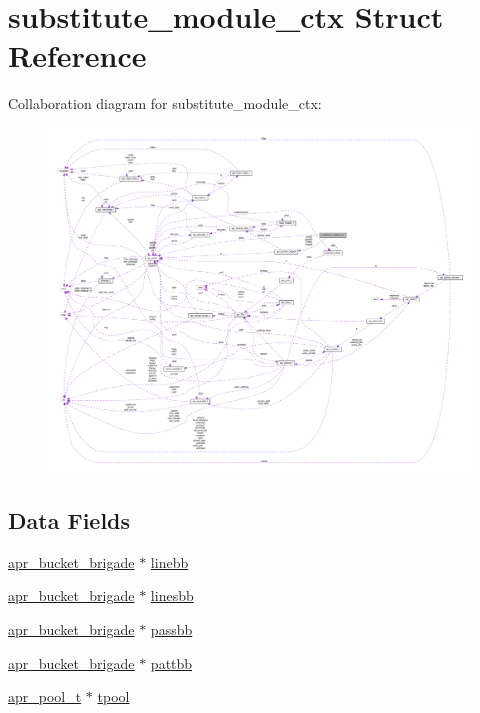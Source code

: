 \hypertarget{structsubstitute__module__ctx}{}\section{substitute\+\_\+module\+\_\+ctx Struct Reference}
\label{structsubstitute__module__ctx}


Collaboration diagram for substitute\+\_\+module\+\_\+ctx\+:
\nopagebreak
\begin{figure}[H]
\begin{center}
\leavevmode
\includegraphics[width=350pt]{structsubstitute__module__ctx__coll__graph}
\end{center}
\end{figure}
\subsection*{Data Fields}
\begin{DoxyCompactItemize}
\item 
\hyperlink{structapr__bucket__brigade}{apr\+\_\+bucket\+\_\+brigade} $\ast$ \hyperlink{structsubstitute__module__ctx_aa950774fcdc41110f49825ee6c80eefe}{linebb}
\item 
\hyperlink{structapr__bucket__brigade}{apr\+\_\+bucket\+\_\+brigade} $\ast$ \hyperlink{structsubstitute__module__ctx_a0baa37d3be7c2342659c6bd5d8701d4e}{linesbb}
\item 
\hyperlink{structapr__bucket__brigade}{apr\+\_\+bucket\+\_\+brigade} $\ast$ \hyperlink{structsubstitute__module__ctx_a6f34e7843edfed798cf31135e9cc0635}{passbb}
\item 
\hyperlink{structapr__bucket__brigade}{apr\+\_\+bucket\+\_\+brigade} $\ast$ \hyperlink{structsubstitute__module__ctx_a16e16144c0325dcdc3a5999f027167d7}{pattbb}
\item 
\hyperlink{structapr__pool__t}{apr\+\_\+pool\+\_\+t} $\ast$ \hyperlink{structsubstitute__module__ctx_a61347677e01457caf41af3399480c132}{tpool}
\end{DoxyCompactItemize}


